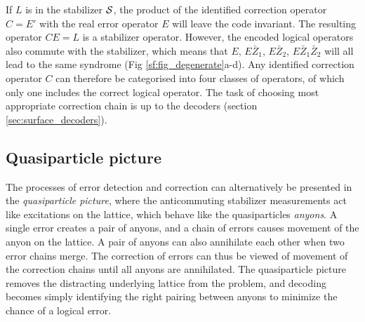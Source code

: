 If $L$ is in the stabilizer $\mathcal{S}$, the product of the identified correction operator $C=E'$ with the real error operator $E$ will leave the code invariant. The resulting operator $CE=L$ is a stabilizer operator. However, the encoded logical operators also commute with the stabilizer, which means that $E$, $E\bar{Z}_1$, $E\bar{Z}_2$, $E\bar{Z}_1\bar{Z}_2$ will all lead to the same syndrome (Fig \ref{sf:fig_degenerate}a-d). Any identified correction operator $C$ can therefore be categorised into four classes of operators, of which only one includes the correct logical operator. The task of choosing most appropriate correction chain is up to the decoders (section \ref{sec:surface_decoders}).

\subsection{Quasiparticle picture}

The processes of error detection and correction can alternatively be presented in the \emph{quasiparticle picture}, where the anticommuting stabilizer measurements act like excitations on the lattice, which behave like the quasiparticles \emph{anyons}. A single error creates a pair of anyons, and a chain of errors causes movement of the anyon on the lattice. A pair of anyons can also annihilate each other when two error chains merge. The correction of errors can thus be viewed of movement of the correction chains until all anyons are annihilated. The quasiparticle picture removes the distracting underlying lattice from the problem, and decoding becomes simply identifying the right pairing between anyons to minimize the chance of a logical error.

